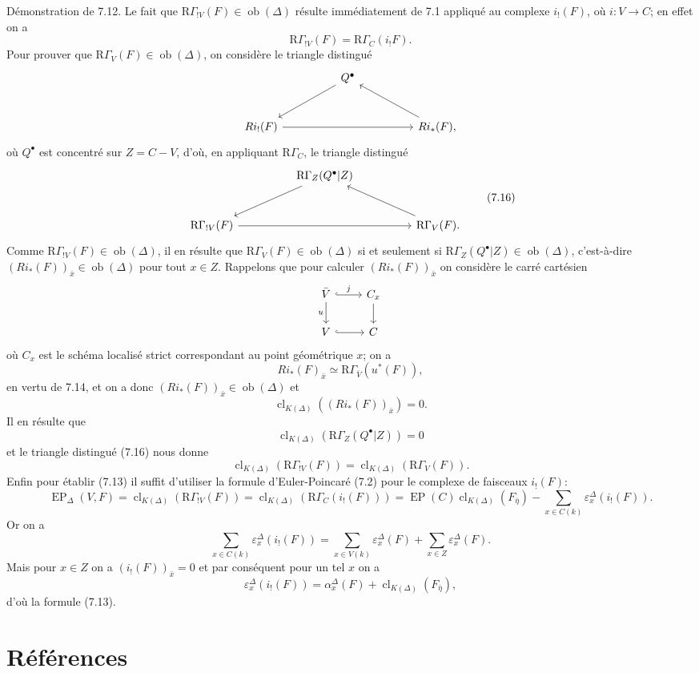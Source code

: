 \documentclass[11pt]{article}
\providecommand{\EP}{\operatorname{EP}}
\providecommand{\Ob}{\operatorname{ob}}
\providecommand{\Ob}{\operatorname{ob}}
\providecommand{\EP}{\operatorname{EP}}
\providecommand{\Ob}{\operatorname{Ob}}
\providecommand{\clK}[1]{\operatorname{cl}_{K(#1)}}
\providecommand{\RG}{\mathrm R\Gamma}
\providecommand{\Ob}{\operatorname{ob}}
\providecommand{\Ob}{\operatorname{Ob}}
\begin{document}
Démonstration de 7.12. Le fait que $\RG_{!V}(F)\in\Ob(\Delta)$ résulte immédiatement de 7.1 appliqué au complexe $i_!(F)$, où $i:V\to C$; en effet on a
\[
\RG_{!V}(F)=\RG_C(i_!F).
\]
Pour prouver que $\RG_V(F)\in\Ob(\Delta)$, on considère le triangle distingué
\[
\begin{tikzcd}[column sep=huge,row sep=large]
& Q^\bullet \arrow[dl] &\\
Ri_!(F) \arrow[rr] && Ri_*(F) \arrow[ul],
\end{tikzcd}
\]
où $Q^\bullet$ est concentré sur $Z=C-V$, d'où, en appliquant $\RG_C$, le triangle distingué
\[
\begin{tikzcd}[column sep=huge,row sep=large]
& \RG_Z(Q^\bullet|Z) \arrow[dl] &\\
\RG_{!V}(F) \arrow[rr] && \RG_V(F) \arrow[ul].
\end{tikzcd}
\tag{7.16}
\]
Comme $\RG_{!V}(F)\in\Ob(\Delta)$, il en résulte que $\RG_V(F)\in\Ob(\Delta)$ si et seulement si $\RG_Z(Q^\bullet|Z)\in\Ob(\Delta)$, c'est-à-dire $(Ri_*(F))_{\bar x}\in\Ob(\Delta)$ pour tout $x\in Z$. Rappelons que pour calculer $(Ri_*(F))_{\bar x}$ on considère le carré cartésien
\[
\begin{tikzcd}
\bar V \arrow[r,hook,"j"] \arrow[d,"u"'] & C_x \arrow[d]\\
V \arrow[r,hook] & C
\end{tikzcd}
\]
où $C_x$ est le schéma localisé strict correspondant au point géométrique $x$; on a
\[
Ri_*(F)_{\bar x}\simeq \RG_{\bar V}(u^*(F)),
\]
en vertu de 7.14, et on a donc $(Ri_*(F))_{\bar x}\in\Ob(\Delta)$ et
\[
\clK{\Delta}((Ri_*(F))_{\bar x})=0.
\]
Il en résulte que
\[
\clK{\Delta}(\RG_Z(Q^\bullet|Z))=0
\]
et le triangle distingué (7.16) nous donne
\[
\clK{\Delta}(\RG_{!V}(F))=\clK{\Delta}(\RG_V(F)).
\]
Enfin pour établir (7.13) il suffit d'utiliser la formule d'Euler-Poincaré (7.2) pour le complexe de faisceaux $i_!(F)$:
\[
\EP_\Delta(V,F)
=
\clK{\Delta}(\RG_{!V}(F))
=
\clK{\Delta}(\RG_C(i_!(F)))
=
\EP(C)\clK{\Delta}(F_{\bar\eta})
-\sum_{x\in C(k)}\varepsilon_x^\Delta(i_!(F)).
\]
Or on a
\[
\sum_{x\in C(k)}\varepsilon_x^\Delta(i_!(F))
=
\sum_{x\in V(k)}\varepsilon_x^\Delta(F)
+\sum_{x\in Z}\varepsilon_x^\Delta(F).
\]
Mais pour $x\in Z$ on a $(i_!(F))_{\bar x}=0$ et par conséquent pour un tel $x$ on a
\[
\varepsilon_x^\Delta(i_!(F))
=
\alpha_x^\Delta(F)+\clK{\Delta}(F_{\bar\eta}),
\]
d'où la formule (7.13).

\section*{Références}
\end{document}
